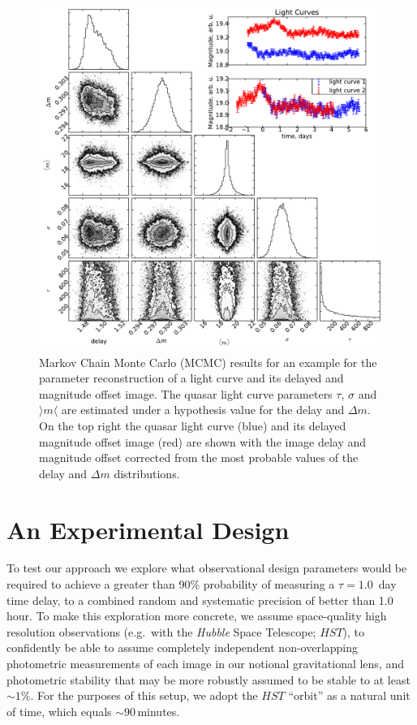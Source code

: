\documentclass{emulateapj}
\begin{document}
\begin{figure}[t]
\begin{center}
\includegraphics[width=\linewidth]{./triangle_example.pdf}
\caption{Markov Chain Monte Carlo (MCMC) results for an example for
  the parameter reconstruction of a light curve and its delayed and
  magnitude offset image. The quasar light curve parameters $\tau$,
  $\sigma$ and $\rangle m \langle$ are estimated under a hypothesis
  value for the delay and $\Delta m$. On the top right the quasar
  light curve (blue) and its delayed magnitude offset image (red) are
  shown with the image delay and magnitude offset corrected from the
  most probable values of the delay and $\Delta m$
  distributions.}\label{fig:triangle}
\end{center}
\end{figure}

\section{An Experimental Design}\label{sec:experiment}

To test our approach we explore what observational design parameters
would be required to achieve a greater than 90\% probability of
measuring a $\tau=1.0$~day time delay, to a combined random and
systematic precision of better than 1.0 hour. To make this exploration
more concrete, we assume space-quality high resolution observations
(e.g.\ with the \emph{Hubble} Space Telescope; $HST$), to confidently
be able to assume completely independent non-overlapping photometric
measurements of each image in our notional gravitational lens, and
photometric stability that may be more robustly assumed to be stable
to at least $\sim1\%$.  For the purposes of this setup, we adopt the
$HST$ ``orbit'' as a natural unit of time, which equals
$\sim90$\,minutes.  
\end{document}
